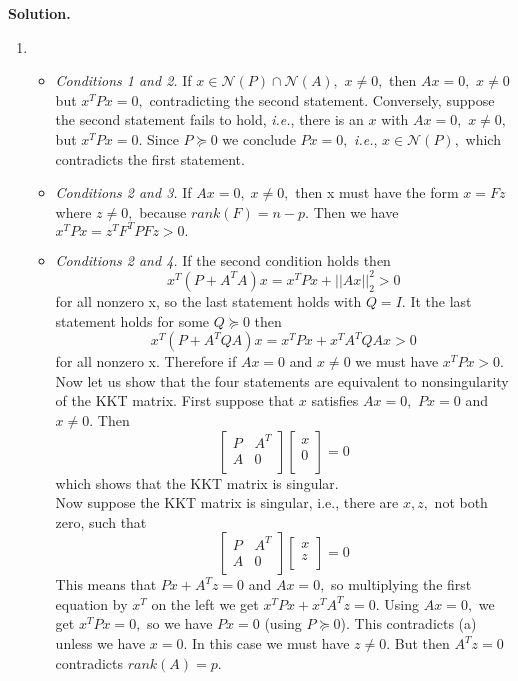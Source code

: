 \documentclass{article}
\begin{document}
\textbf{Solution.} \\

\begin{enumerate}[label=\alph*)]
\item 
\begin{itemize}
    \item \textit{Conditions 1 and 2.}
    If $x \in \mathcal{N}(P) \cap \mathcal{N}(A),$ 
    $x \ne 0,$ then $Ax = 0,$ $x \ne 0$ but $x^T P x = 0,$
    contradicting the second statement. Conversely, suppose the second statement fails to hold, 
    \textit{i.e.}, there is an $x$ with $Ax = 0,$
    $x \ne 0,$ but $x^T P x = 0.$ Since $P \succeq 0$ 
    we conclude $Px = 0,$ \textit{i.e.},
    $x \in \mathcal{N}(P),$ which
    contradicts the first statement.
    	
	\item \textit{Conditions 2 and 3.}
	If $Ax = 0, \; x \ne 0,$ 
	then x must have the form
	$x = Fz$ where $z \ne 0,$
	because $rank(F) = n - p.$ Then we have
	$x^T P x = z^T F^T P F z > 0.$
	
	\item \textit{Conditions 2 and 4.} 
	If the second condition holds then 
	$$
	x^T(P + A^TA)x = x^TPx + ||Ax||_2^2 > 0
	$$
	for all nonzero x, so the last statement holds with
	$Q = I.$ It the last statement holds for some 
	$Q \succeq 0$ then
	$$
	x^T(P + A^TQA)x = x^TPx + x^T A^T Q A x > 0	
	$$
	for all nonzero x. Therefore if 
	$Ax = 0$ and $x \ne 0$ we must have $x^TPx > 0.$ \\
	Now let us show that the four statements are equivalent to nonsingularity of the
	KKT matrix. First suppose that $x$ satisfies 
	$Ax = 0,$ $Px = 0$ and $x \ne 0.$ Then 
	$$
	\begin{bmatrix} 
		P & A^T \\
		A & 0\\
	\end{bmatrix}
	\begin{bmatrix} 
	x\\
	0\\
	\end{bmatrix} = 0
	$$
which shows that the KKT matrix is singular.\\
Now suppose the KKT matrix is singular, i.e., there are $x, z,$ not both zero, such that	
	$$
\begin{bmatrix} 
	P & A^T \\
	A & 0\\
\end{bmatrix}
\begin{bmatrix} 
	x\\
	z\\
\end{bmatrix} = 0
$$
This means that $Px + A^Tz = 0$ and $Ax = 0,$ so multiplying the first equation by $x^T$ on the left 
we get $x^TPx + x^TA^Tz = 0.$ Using $Ax = 0,$ we get 
$x^T P x = 0,$ so we have $Px = 0$ (using $P \succeq 0$).
This contradicts (a) unless we have $x = 0.$ In this case we must have $z \ne 0.$ But then $A^Tz = 0$ contradicts 
$rank(A) = p.$


\end{itemize}
\end{enumerate}
\end{document}

